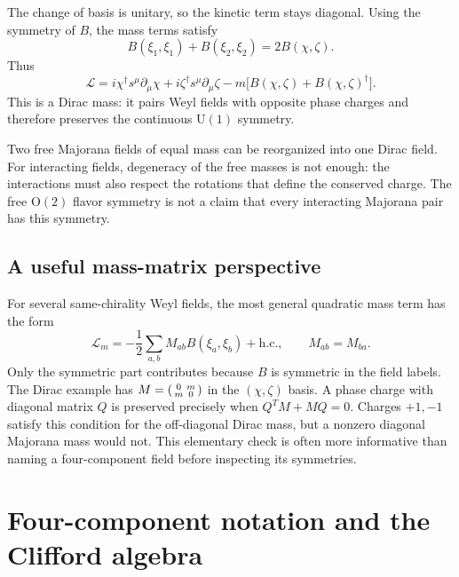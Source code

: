 \documentclass[11pt]{article}
\newcommand{\Lag}{\mathcal{L}}
\newcommand{\OO}{\mathrm{O}}
\newcommand{\UU}{\mathrm{U}}
\newcommand{\hc}{\mathrm{h.c.}}
\begin{document}
The change of basis is unitary, so the kinetic term stays diagonal.
Using the symmetry of \(B\), the mass terms satisfy
\begin{equation}
 B(\xi_1,\xi_1)+B(\xi_2,\xi_2)=2B(\chi,\zeta).
 \label{eq:masschange}
\end{equation}
Thus
\begin{equation}
 \Lag=i\chi^\dagger s^\mu\partial_\mu\chi
      +i\zeta^\dagger s^\mu\partial_\mu\zeta
      -m\big[B(\chi,\zeta)+B(\chi,\zeta)^\dagger\big].
 \label{eq:twodirac}
\end{equation}
This is a Dirac mass: it pairs Weyl fields with opposite phase charges
and therefore preserves the continuous \(\UU(1)\) symmetry.

\begin{remarkbox}
Two free Majorana fields of equal mass can be reorganized into one
Dirac field. For interacting fields, degeneracy of the free masses is
not enough: the interactions must also respect the rotations that
define the conserved charge. The free \(\OO(2)\) flavor symmetry is
not a claim that every interacting Majorana pair has this symmetry.
\end{remarkbox}

\subsection{A useful mass-matrix perspective}
For several same-chirality Weyl fields, the most general quadratic
mass term has the form
\begin{equation}
 \Lag_m=-\frac12\sum_{a,b}M_{ab}B(\xi_a,\xi_b)+\hc,
 \qquad M_{ab}=M_{ba}.
 \label{eq:massmatrix}
\end{equation}
Only the symmetric part contributes because \(B\) is symmetric in
the field labels. The Dirac example has
\(M=\begin{psmallmatrix}0&m\\m&0\end{psmallmatrix}\) in the
\((\chi,\zeta)\) basis. A phase charge with diagonal matrix \(Q\)
is preserved precisely when
\(Q^T M+M Q=0\). Charges \(+1,-1\) satisfy this condition for the
off-diagonal Dirac mass, but a nonzero diagonal Majorana mass would
not. This elementary check is often more informative than naming a
four-component field before inspecting its symmetries.

\section{Four-component notation and the Clifford algebra}
\end{document}
